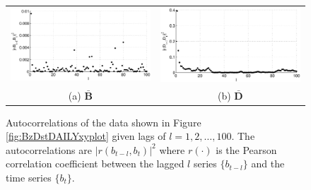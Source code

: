 \begin{figure}[ht]
\begin{tabular}{cc}
\includegraphics[scale=0.48]{SolarExample_autocorrBzdaily.eps} & \includegraphics[scale=0.48]{SolarExample_autocorrDdaily.eps} \\
(a) $\bar{\mathbf{B}}$ & (b) $\bar{\mathbf{D}}$
\end{tabular}
\caption{Autocorrelations of the data shown in Figure \ref{fig:BzDstDAILYxyplot} given lags of $l=1,2,\ldots,100$.  The autocorrelations are $|r(b_{t-l},b_t)|^2$ where $r(\cdot)$ is the Pearson correlation coefficient between the lagged $l$ series $\{b_{t-l}\}$ and the time series $\{b_{t}\}$.}
\label{fig:BzDstDAILYxyautocorr}
\end{figure}

